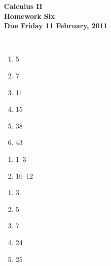 \documentclass[12pt]{article}
\begin{document}
\pagestyle{empty}
 
\begin{center}
{\large {\bf Calculus II}}\\
\medskip
{\large {\bf Homework Six}}\\
\medskip
{ {\bf Due Friday 11 February, 2011}}\\
\end{center}

\hspace{2mm}\\
   


\begin{enumerate}
\setlength{\itemsep}{-1mm}
  \item 5
  \item 7
  \item 11
  \item 15
  \item 38
  \item 43
\end{enumerate}


\begin{enumerate}
\setlength{\itemsep}{-1mm}
  \item 1--3
  \item 10--12
\end{enumerate}



\begin{enumerate}
\setlength{\itemsep}{-1mm}
  \item 3
  \item 5
  \item 7
  \item 24
  \item 25
\end{enumerate}
\end{document}
